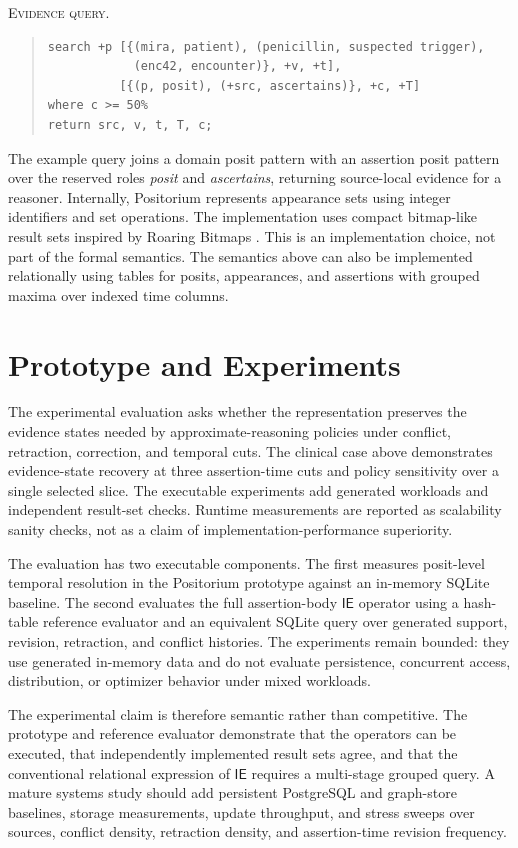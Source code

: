 \documentclass[a4paper,fleqn]{cas-sc}
\newcommand{\ie}{\mathsf{IE}}
\theoremstyle{plain}
\theoremstyle{remark}
\begin{document}
\textsc{Evidence query.}
\begin{quote}
\small
\begin{verbatim}
search +p [{(mira, patient), (penicillin, suspected trigger),
            (enc42, encounter)}, +v, +t],
          [{(p, posit), (+src, ascertains)}, +c, +T]
where c >= 50%
return src, v, t, T, c;
\end{verbatim}
\end{quote}

The example query joins a domain posit pattern with an assertion posit pattern over the reserved roles \textit{posit} and \textit{ascertains}, returning source-local evidence for a reasoner. Internally, Positorium represents appearance sets using integer identifiers and set operations. The implementation uses compact bitmap-like result sets inspired by Roaring Bitmaps \cite{Chambi}. This is an implementation choice, not part of the formal semantics. The semantics above can also be implemented relationally using tables for posits, appearances, and assertions with grouped maxima over indexed time columns.

\section{Prototype and Experiments}
\label{Sec:evaluation}
The experimental evaluation asks whether the representation preserves the evidence states needed by approximate-reasoning policies under conflict, retraction, correction, and temporal cuts. The clinical case above demonstrates evidence-state recovery at three assertion-time cuts and policy sensitivity over a single selected slice. The executable experiments add generated workloads and independent result-set checks. Runtime measurements are reported as scalability sanity checks, not as a claim of implementation-performance superiority.

The evaluation has two executable components. The first measures posit-level temporal resolution in the Positorium prototype against an in-memory SQLite baseline. The second evaluates the full assertion-body \(\ie\) operator using a hash-table reference evaluator and an equivalent SQLite query over generated support, revision, retraction, and conflict histories. The experiments remain bounded: they use generated in-memory data and do not evaluate persistence, concurrent access, distribution, or optimizer behavior under mixed workloads.

The experimental claim is therefore semantic rather than competitive. The prototype and reference evaluator demonstrate that the operators can be executed, that independently implemented result sets agree, and that the conventional relational expression of \(\ie\) requires a multi-stage grouped query. A mature systems study should add persistent PostgreSQL and graph-store baselines, storage measurements, update throughput, and stress sweeps over sources, conflict density, retraction density, and assertion-time revision frequency.
\end{document}

